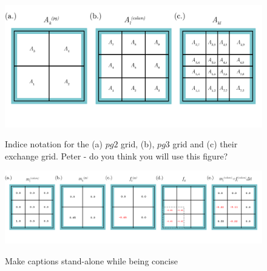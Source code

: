\documentclass{agujournal}
\begin{document}
\begin{figure}[t]
\begin{center}
\noindent\includegraphics[width=30pc,angle=0]{figs/area-schematic.png}\\
\end{center}
\caption{Indice notation for the (a) $pg2$ grid, (b), $pg3$ grid and (c) their exchange grid. {\color{red}Peter - do you think you will use this figure?}}
\label{fig:area-schematic}
\end{figure}

\begin{figure}[t]
\begin{center}
\noindent\includegraphics[width=30pc,angle=0]{figs/alg-schematic.png}\\
\end{center}
\caption{Make captions stand-alone while being concise}
\label{fig:alg-schematic}
\end{figure}

\end{document}
